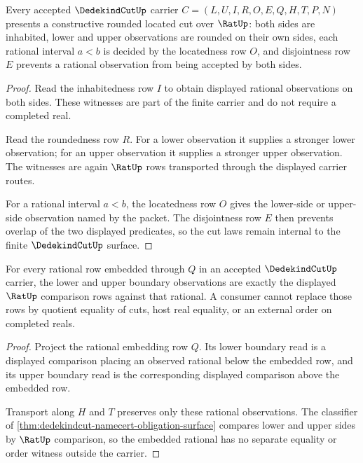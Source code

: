 \begin{theorem}
\label{thm:dedekindcut-located-rounded-cut-laws}
Every accepted $\DedekindCutUp$ carrier $C=(L,U,I,R,O,E,Q,H,T,P,N)$ presents a constructive rounded located cut over $\RatUp$: both sides are inhabited, lower and upper observations are rounded on their own sides, each rational interval $a<b$ is decided by the locatedness row $O$, and disjointness row $E$ prevents a rational observation from being accepted by both sides.
\end{theorem}
\begin{proof}
Read the inhabitedness row $I$ to obtain displayed rational observations on both sides. These witnesses are part of the finite carrier and do not require a completed real.

Read the roundedness row $R$. For a lower observation it supplies a stronger lower observation; for an upper observation it supplies a stronger upper observation. The witnesses are again $\RatUp$ rows transported through the displayed carrier routes.

For a rational interval $a<b$, the locatedness row $O$ gives the lower-side or upper-side observation named by the packet. The disjointness row $E$ then prevents overlap of the two displayed predicates, so the cut laws remain internal to the finite $\DedekindCutUp$ surface.
\end{proof}

\begin{theorem}
\label{thm:dedekindcut-rational-embedding-boundary}
For every rational row embedded through $Q$ in an accepted $\DedekindCutUp$ carrier, the lower and upper boundary observations are exactly the displayed $\RatUp$ comparison rows against that rational. A consumer cannot replace those rows by quotient equality of cuts, host real equality, or an external order on completed reals.
\end{theorem}
\begin{proof}
Project the rational embedding row $Q$. Its lower boundary read is a displayed comparison placing an observed rational below the embedded row, and its upper boundary read is the corresponding displayed comparison above the embedded row.

Transport along $H$ and $T$ preserves only these rational observations. The classifier of \autoref{thm:dedekindcut-namecert-obligation-surface} compares lower and upper sides by $\RatUp$ comparison, so the embedded rational has no separate equality or order witness outside the carrier.
\end{proof}

